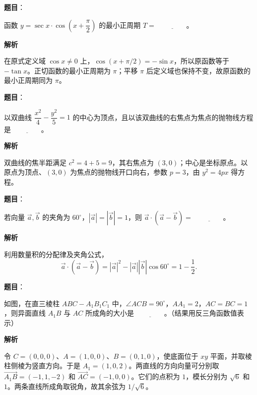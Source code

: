 \begin{answer}

\textbf{题目}：

函数 $y=\sec x\cdot\cos\left(x+\dfrac{\pi}{2}\right)$ 的最小正周期 $T=$ $\underline{\qquad\qquad}$。

\textbf{解析}

在原式定义域 $\cos x\ne0$ 上，$\cos(x+\pi/2)=-\sin x$，所以原函数等于 $-\tan x$。正切函数的最小正周期为 $\pi$；平移 $\pi$ 后定义域也保持不变，故原函数的最小正周期同为 $\pi$。


\end{answer}
\begin{answer}

\textbf{题目}：

以双曲线 $\dfrac{x^2}{4}-\dfrac{y^2}{5}=1$ 的中心为顶点，且以该双曲线的右焦点为焦点的抛物线方程是 $\underline{\qquad\qquad}$。

\textbf{解析}

双曲线的焦半距满足 $c^2=4+5=9$，其右焦点为 $(3,0)$；中心是坐标原点。以原点为顶点、$(3,0)$ 为焦点的抛物线开口向右，参数 $p=3$，由 $y^2=4px$ 得方程。


\end{answer}
\begin{answer}

\textbf{题目}：

若向量 $\vec{a},\vec{b}$ 的夹角为 $60^\circ$，$|\vec{a}|=|\vec{b}|=1$，则 $\vec{a}\cdot(\vec{a}-\vec{b})=$ $\underline{\qquad\qquad}$。

\textbf{解析}

利用数量积的分配律及夹角公式，
\nopagebreak[4]
\[
\vec a\cdot(\vec a-\vec b)=|\vec a|^2-|\vec a||\vec b|\cos60^\circ=1-\frac12.
\]


\end{answer}
\begin{answer}

\textbf{题目}：

如图，在直三棱柱 $ABC-A_1B_1C_1$ 中，$\angle ACB=90^\circ$，$AA_1=2$，$AC=BC=1$，则异面直线 $A_1B$ 与 $AC$ 所成角的大小是 $\underline{\qquad\qquad}$。（结果用反三角函数值表示）
\nopagebreak[4]
\begin{center}\end{center}
\nopagebreak[4]
\textbf{解析}

令 $C=(0,0,0)$、$A=(1,0,0)$、$B=(0,1,0)$，使底面位于 $xy$ 平面，并取棱柱侧棱为竖直方向。于是 $A_1=(1,0,2)$。两直线的方向向量可分别取 $\overrightarrow{A_1B}=(-1,1,-2)$ 和 $\overrightarrow{AC}=(-1,0,0)$。它们的点积为 $1$，模长分别为 $\sqrt6$ 和 $1$。两条直线所成角取锐角，故其余弦为 $1/\sqrt6$。


\end{answer}
